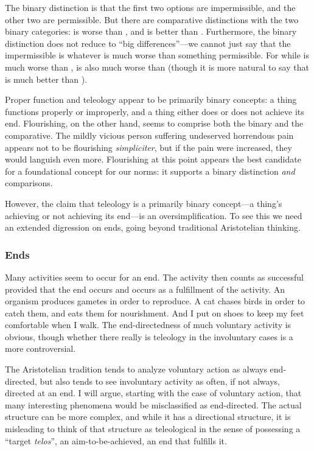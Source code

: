 
The binary distinction is that
the first two options are impermissible, and the other two are permissible. But there are comparative distinctions
with the two binary categories:  is worse than , and  is better than . 
Furthermore, the binary distinction does 
not reduce to ``big differences''---we cannot just say that the impermissible is whatever is much worse than 
something permissible. For while  is much worse than ,  is also much worse than  (though 
it is more natural to say that  is much better than ). 

Proper function and teleology appear to be primarily binary concepts: a thing functions properly or improperly, and a thing either 
does or does not achieve its end. Flourishing, on the other hand, seems to comprise both the binary and the comparative. The mildly vicious person suffering undeserved horrendous pain appears not to be flourishing \textit{simpliciter}, but if the pain 
were increased,
they would languish even more. Flourishing at this point appears the best candidate for a foundational concept for our norms: it supports a binary distinction \textit{and} comparisons.

However, the claim that teleology is a primarily binary concept---a thing's achieving or not achieving its end---is
an oversimplification. To see this we need an extended digression on ends, going beyond traditional Aristotelian
thinking.

\subsubsection{Ends}
Many activities seem to occur for an end. The activity then counts as successful provided that the end occurs and occurs as a
fulfillment of the activity. An organism produces gametes in order to reproduce. A cat chases birds in order to catch them,
and eats them for nourishment. And I put on shoes to keep my feet comfortable when I walk. The end-directedness of much voluntary
activity is obvious, though whether there really is teleology in the involuntary cases is a more controversial.

The Aristotelian tradition tends to analyze voluntary action as always end-directed, but also tends to see involuntary activity as 
often, if not always, directed at an end. I will argue, starting with the case of voluntary action, that many interesting phenomena 
would be misclassified as end-directed. The actual structure can be more complex, and while it has a directional structure, it is
misleading to think of that structure as teleological in the sense of possessing a ``target \textit{telos}'', an aim-to-be-achieved,
an end that fulfills it.

